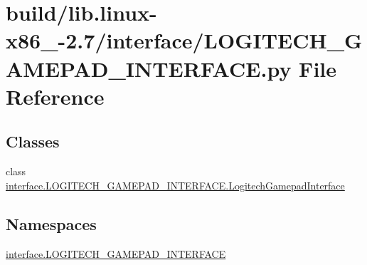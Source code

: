 \hypertarget{build_2lib_8linux-x86__64-2_87_2interface_2LOGITECH__GAMEPAD__INTERFACE_8py}{}\section{build/lib.linux-\/x86\+\_-\/2.7/interface/\+L\+O\+G\+I\+T\+E\+C\+H\+\_\+\+G\+A\+M\+E\+P\+A\+D\+\_\+\+I\+N\+T\+E\+R\+F\+A\+C\+E.py File Reference}
\label{build_2lib_8linux-x86__64-2_87_2interface_2LOGITECH__GAMEPAD__INTERFACE_8py}
\subsection*{Classes}
\begin{DoxyCompactItemize}
\item 
class \hyperlink{classinterface_1_1LOGITECH__GAMEPAD__INTERFACE_1_1LogitechGamepadInterface}{interface.\+L\+O\+G\+I\+T\+E\+C\+H\+\_\+\+G\+A\+M\+E\+P\+A\+D\+\_\+\+I\+N\+T\+E\+R\+F\+A\+C\+E.\+Logitech\+Gamepad\+Interface}
\end{DoxyCompactItemize}
\subsection*{Namespaces}
\begin{DoxyCompactItemize}
\item 
 \hyperlink{namespaceinterface_1_1LOGITECH__GAMEPAD__INTERFACE}{interface.\+L\+O\+G\+I\+T\+E\+C\+H\+\_\+\+G\+A\+M\+E\+P\+A\+D\+\_\+\+I\+N\+T\+E\+R\+F\+A\+C\+E}
\end{DoxyCompactItemize}
